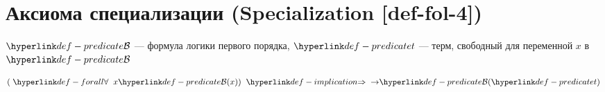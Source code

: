 
\section{Аксиома специализации (Specialization [def-fol-4])}

\hypertarget{def-fol-4}{}
\begin{definition}
\label{entity:def-fol-4}
$\Predicate{\mathcal{B}}$ --- формула логики первого порядка,
$\Predicate{t}$ --- терм, свободный для переменной $x$ в $\Predicate{\mathcal{B}}$

\[
(\TerForall x \Predicate{\mathcal{B}}(x)) \TermImplication{\to} \Predicate{\mathcal{B}}(\Predicate{t})
\]
\end{definition}